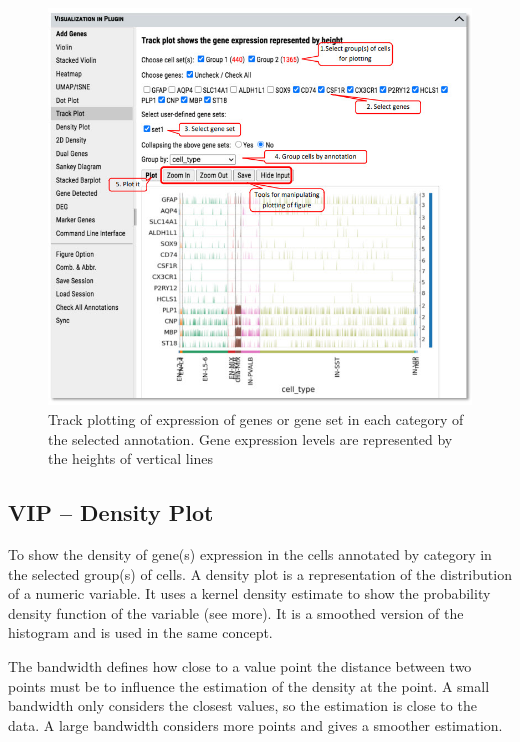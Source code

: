 \documentclass[
]{article}
\begin{document}
\begin{figure}
\centering
\includegraphics{figures/F12.jpg}
\caption{Track plotting of expression of genes or gene set in each category of the selected annotation. Gene expression levels are represented by the heights of vertical lines}
\end{figure}

\hypertarget{vip-density-plot}{%
\subsection{VIP -- Density Plot}\label{vip-density-plot}}

To show the density of gene(s) expression in the cells annotated by category in the selected group(s) of cells. A density plot is a representation of the distribution of a numeric variable. It uses a kernel density estimate to show the probability density function of the variable (see more). It is a smoothed version of the histogram and is used in the same concept.

The bandwidth defines how close to a value point the distance between two points must be to influence the estimation of the density at the point. A small bandwidth only considers the closest values, so the estimation is close to the data. A large bandwidth considers more points and gives a smoother estimation.
\end{document}
